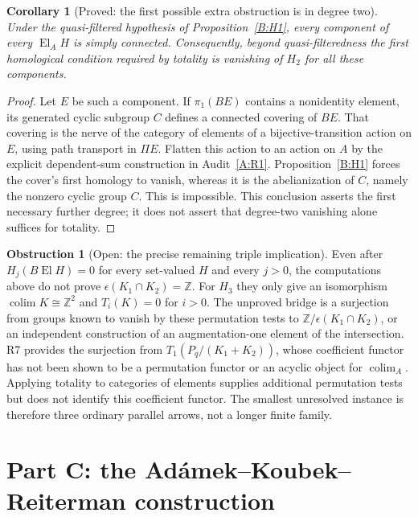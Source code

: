 \documentclass[11pt,a4paper]{article}
\newcommand{\El}{\operatorname{El}}
\newtheorem{corollary}[theorem]{Corollary}
\theoremstyle{definition}
\newtheorem{obstruction}[theorem]{Obstruction}
\begin{document}
\begin{corollary}[Proved: the first possible extra obstruction is in degree two]\label{B:simply-connected}
Under the quasi-filtered hypothesis of Proposition~\ref{B:H1}, every component of every $\El_AH$ is simply connected. Consequently, beyond quasi-filteredness the first homological condition required by totality is vanishing of $H_2$ for all these components.
\end{corollary}
\begin{proof}
Let $E$ be such a component. If $\pi_1(BE)$ contains a nonidentity element, its generated cyclic subgroup $C$ defines a connected covering of $BE$. That covering is the nerve of the category of elements of a bijective-transition action on $E$, using path transport in $\Pi E$. Flatten this action to an action on $A$ by the explicit dependent-sum construction in Audit~\ref{A:R1}. Proposition~\ref{B:H1} forces the cover's first homology to vanish, whereas it is the abelianization of $C$, namely the nonzero cyclic group $C$. This is impossible. This conclusion asserts the first necessary further degree; it does not assert that degree-two vanishing alone suffices for totality.
\end{proof}

\begin{obstruction}[Open: the precise remaining triple implication]\label{B:triple-open}
Even after $H_j(B\operatorname{El}H)=0$ for every set-valued $H$ and every
$j>0$, the computations above do not prove
$\epsilon(K_1\cap K_2)=\mathbb Z$.  For $H_3$ they only give an
isomorphism $\operatorname{colim}K\cong\mathbb Z^2$ and
$T_i(K)=0$ for $i>0$.  The unproved bridge is a surjection from groups
known to vanish by these permutation tests to
$\mathbb Z/\epsilon(K_1\cap K_2)$, or an independent construction of an
augmentation-one element of the intersection.  R7 provides the
surjection from $T_1(P_q/(K_1+K_2))$, whose coefficient functor has not
been shown to be a permutation functor or an acyclic object for
$\operatorname{colim}_A$.  Applying totality to categories of elements
supplies additional permutation tests but does not identify this
coefficient functor.  The smallest unresolved instance is therefore
three ordinary parallel arrows, not a longer finite family.

\end{obstruction}
\section{Part C: the Ad\'amek--Koubek--Reiterman construction}\label{sec:C}
\end{document}
